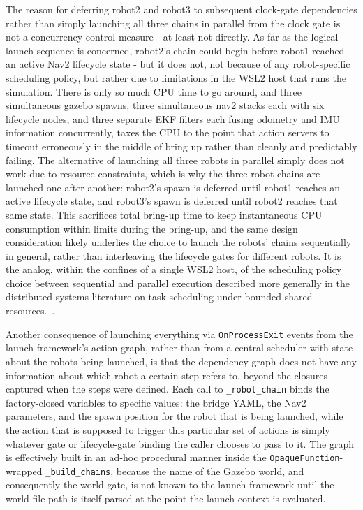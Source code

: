 The reason for deferring robot2 and robot3 to subsequent clock-gate dependencies rather than simply launching all three chains in parallel from the clock gate is not a concurrency control measure - at least not directly. As far as the logical launch sequence is concerned, robot2's chain could begin before robot1 reached an active Nav2 lifecycle state - but it does not, not because of any robot-specific scheduling policy, but rather due to limitations in the WSL2 host that runs the simulation. There is only so much CPU time to go around, and three simultaneous gazebo spawns, three simultaneous nav2 stacks each with six lifecycle nodes, and three separate EKF filters each fusing odometry and IMU information concurrently, taxes the CPU to the point that action servers to timeout erroneously in the middle of bring up rather than cleanly and predictably failing. The alternative of launching all three robots in parallel simply does not work due to resource constraints, which is why the three robot chains are launched one after another: robot2's spawn is deferred until robot1 reaches an active lifecycle state, and robot3's spawn is deferred until robot2 reaches that same state. This sacrifices total bring-up time to keep instantaneous CPU consumption within limits during the bring-up, and the same design consideration likely underlies the choice to launch the robots' chains sequentially in general, rather than interleaving the lifecycle gates for different robots. It is the analog, within the confines of a single WSL2 host, of the scheduling policy choice between sequential and parallel execution described more generally in the distributed-systems literature on task scheduling under bounded shared resources.~\cite{blass2021ros}.

Another consequence of launching everything via \texttt{OnProcessExit} events from the launch framework's action graph, rather than from a central scheduler with state about the robots being launched, is that the dependency graph does not have any information about which robot a certain step refers to, beyond the closures captured when the steps were defined. Each call to \texttt{\_robot\_chain} binds the factory-closed variables to specific values: the bridge YAML, the Nav2 parameters, and the spawn position for the robot that is being launched, while the action that is supposed to trigger this particular set of actions is simply whatever gate or lifecycle-gate binding the caller chooses to pass to it. The graph is effectively built in an ad-hoc procedural manner inside the \texttt{OpaqueFunction}-wrapped \texttt{\_build\_chains}, because the name of the Gazebo world, and consequently the world gate, is not known to the launch framework until the world file path is itself parsed at the point the launch context is evaluated.

